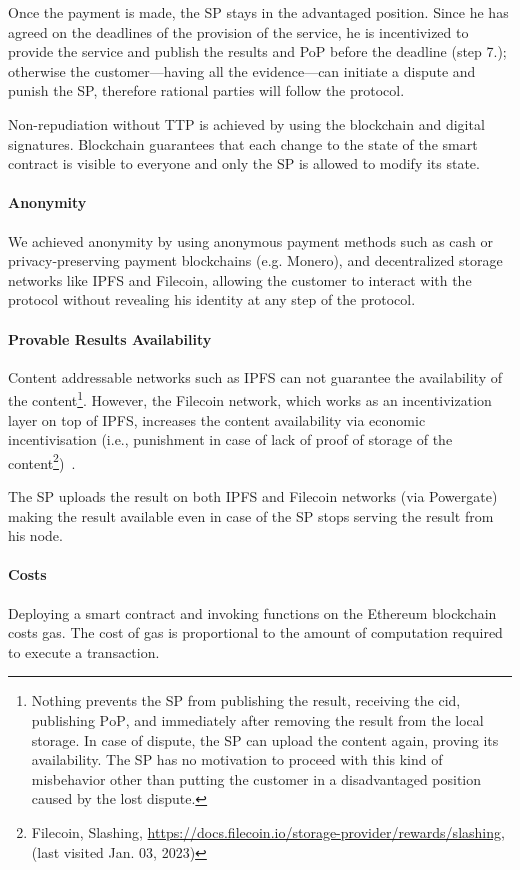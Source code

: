 Once the payment is made, the SP stays in the advantaged position. Since he has agreed on the deadlines of the provision of the service, he is incentivized
to provide the service and publish the results and PoP before the deadline (step 7.); otherwise the customer—having all the evidence—can initiate a dispute and punish the SP, therefore rational parties will follow the protocol.

Non-repudiation without TTP is achieved by using the blockchain and digital signatures. Blockchain guarantees that each change to the state of the smart contract is visible to everyone and only the SP is allowed to modify its state. 

\paragraph{Anonymity}
We achieved anonymity by using anonymous payment methods such as cash or privacy-preserving payment blockchains (e.g. Monero), and decentralized storage networks like IPFS and Filecoin, allowing the customer to interact with the protocol without revealing his identity at any step of the protocol.

\paragraph{Provable Results Availability}
Content addressable networks such as IPFS can not guarantee the availability of the content\footnote{Nothing prevents the SP from publishing the result, receiving the $\mathrm{cid}$, publishing $\mathrm{PoP}$, and immediately after removing the result from the local storage. In case of dispute, the SP can upload the content again, proving its availability. The SP has no motivation to proceed with this kind of misbehavior other than putting the customer in a disadvantaged position caused by the lost dispute.}. However, the Filecoin network, which works as an incentivization layer on top of IPFS, increases the content availability via economic incentivisation (i.e., punishment in case of lack of proof of storage of the content\footnote{Filecoin, Slashing, \url{https://docs.filecoin.io/storage-provider/rewards/slashing}, (last visited Jan. 03, 2023)})~\cite{protocollabsFilecoinDecentralizedStorage2017}.

The SP uploads the result on both IPFS and Filecoin networks (via Powergate) making the result available even in case of the SP stops serving the result from his node.

\paragraph{Costs}
Deploying a smart contract and invoking functions on the Ethereum blockchain costs gas. The cost of gas is proportional to the amount of computation required to execute a transaction. 

